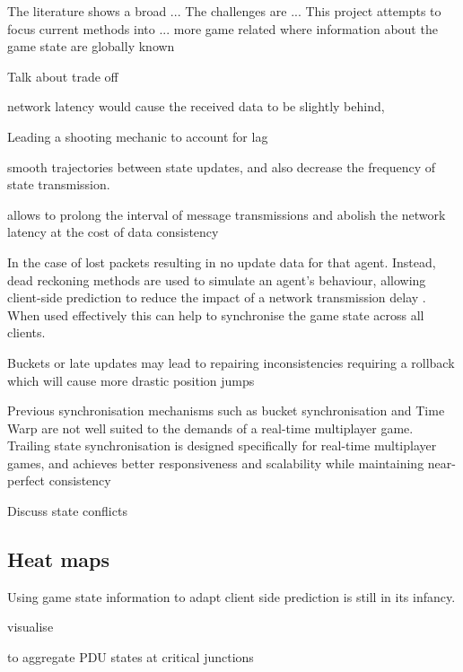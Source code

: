 \documentclass[journal]{IEEEtran}
\begin{document}
The literature shows a broad ...
The challenges are ...
This project attempts to focus current methods into ... more game related where information about the game state are globally known



Talk about trade off

network latency would cause the received data to be slightly behind,

Leading a shooting mechanic to account for lag \cite{bernier2001latency}

smooth trajectories between state updates, and also decrease the frequency of state transmission.

allows to prolong the interval of message transmissions and abolish the network latency at the cost of data consistency \cite{smed2002aspects}

In the case of lost packets resulting in no update data for that agent. Instead, dead reckoning methods are used to simulate an agent's behaviour, allowing client-side prediction to reduce the impact of a network transmission delay \cite{pantel2002suitability}. When used effectively this can help to synchronise the game state across all clients.




Buckets or late updates may lead to repairing inconsistencies requiring a rollback which will cause more drastic position jumps \cite{cronin2002efficient}

Previous synchronisation mechanisms such as bucket synchronisation and Time Warp are not well suited to the demands of a real-time multiplayer game. Trailing state synchronisation is designed specifically for real-time multiplayer games, and achieves better responsiveness and scalability while maintaining near-perfect consistency \cite{cronin2001distributed}


Discuss state conflicts





\subsection{Heat maps}

Using game state information to adapt client side prediction is still in its infancy.

visualise

to aggregate PDU states at critical junctions
\end{document}
